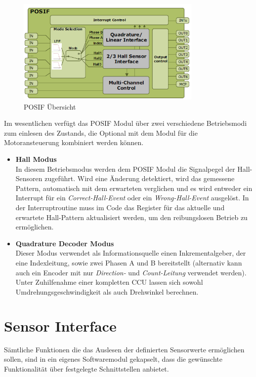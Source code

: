 \begin{figure}[ht]
\centering
\includegraphics[width=0.8\textwidth]{sensor/posif_overview.PNG}
\caption{POSIF Übersicht}
\label{img:posif_overview}
\end{figure}

Im wesentlichen verfügt das POSIF Modul über zwei verschiedene Betriebsmodi zum einlesen des Zustands, die Optional mit dem Modul für die Motoransteuerung kombiniert werden können.

\begin{itemize}
\item \textbf{Hall Modus} \\
In diesem Betriebsmodus werden dem POSIF Modul die Signalpegel der Hall-Sensoren zugeführt. Wird eine Änderung detektiert, wird das gemessene Pattern, automatisch mit dem erwarteten verglichen und es wird entweder ein Interrupt für ein \textit{Correct-Hall-Event} oder ein \textit{Wrong-Hall-Event} ausgelöst. In der Interruptroutine muss im Code das Register für das aktuelle und erwartete Hall-Pattern aktualisiert werden, um den reibungslosen Betrieb zu ermöglichen.
\item \textbf{Quadrature Decoder Modus} \\
Dieser Modus verwendet als Informationsquelle einen Inkrementalgeber, der eine Indexleitung, sowie zwei Phasen A und B bereitstellt (alternativ kann auch ein Encoder mit nur \textit{Direction-} und \textit{Count-Leitung} verwendet werden). Unter Zuhilfenahme einer kompletten CCU lassen sich sowohl Umdrehungsgeschwindigkeit als auch Drehwinkel berechnen.
\end{itemize}

\section{Sensor Interface}
Sämtliche Funktionen die das Auslesen der definierten Sensorwerte ermöglichen sollen, sind in ein eigenes Softwaremodul gekapselt, dass die gewünschte Funktionalität über festgelegte Schnittstellen anbietet. \\

